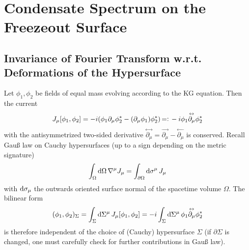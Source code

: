 \chapter{Condensate Spectrum on the Freezeout Surface}

\section{Invariance of Fourier Transform w.r.t. Deformations of the Hypersurface}
\label{subsec:FourierDeformHypersurface}

Let $\phi_1,\phi_2$ be fields of equal mass evolving according to the KG equation. Then the current
\begin{equation}
    J_\mu[\phi_1,\phi_2]=-{i}(\phi_1\partial_\mu\phi_2^*-(\partial_\mu\phi_1)\phi_2^*){\,=\vcentcolon\,}-{i}\phi_1\overset{\leftrightarrow}{\partial_\mu}\phi_2^*
\end{equation}
with the antisymmetrized two-sided derivative $\overset{\leftrightarrow}{\partial_\mu}=\overset{\rightarrow}{\partial_\mu}-\overset{\leftarrow}{\partial_\mu}$ is conserved. Recall Gauß law on Cauchy hypersurfaces (up to a sign depending on the metric signature)
\begin{equation}
    \int_\Omega\text{d} \Omega\,\nabla^\mu J_\mu=\int_{\partial\Omega}\text{d}\sigma^\mu\,J_\mu
\end{equation}
with $\text{d}\sigma_\mu$ the outwards oriented surface normal of the spacetime volume $\Omega$. The bilinear form
\begin{equation}
    (\phi_1,\phi_2)_\Sigma=\int_\Sigma\text{d}\Sigma^\mu\,J_\mu[\phi_1,\phi_2]=-{i}\int_\Sigma\text{d}\Sigma^\mu\,\phi_1\overset{\leftrightarrow}{\partial_\mu}\phi_2^*
\end{equation}
is therefore independent of the choice of (Cauchy) hypersurface $\Sigma$ (if $\partial\Sigma$ is changed, one must carefully check for further contributions in Gauß law).

